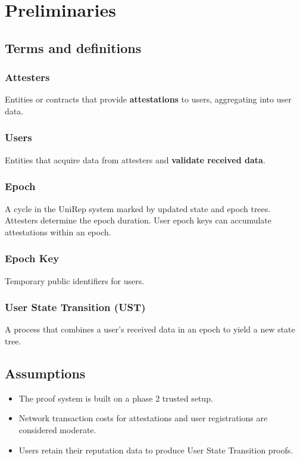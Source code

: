 \documentclass[11pt]{article}
\begin{document}
\section{Preliminaries}
\label{sec:orgfd26e6e}

\subsection{Terms and definitions}
\label{sec:orgf71e98b}

\subsubsection{Attesters}
\label{sec:orge06bb9e}
Entities or contracts that provide \textbf{\textbf{attestations}} to users, aggregating into user data.
\subsubsection{Users}
\label{sec:org4387de1}
Entities that acquire data from attesters and \textbf{\textbf{validate received data}}.
\subsubsection{Epoch}
\label{sec:org88aad3f}
A cycle in the UniRep system marked by updated state and epoch trees. Attesters determine the epoch duration. User epoch keys can accumulate attestations within an epoch.
\subsubsection{Epoch Key}
\label{sec:org7101571}
Temporary public identifiers for users.
\subsubsection{User State Transition (UST)}
\label{sec:org19b9fec}
A process that combines a user's received data in an epoch to yield a new state tree.
\subsection{Assumptions}
\label{sec:orge900b6d}
\begin{itemize}
\item The proof system is built on a phase 2 trusted setup.
\item Network transaction costs for attestations and user registrations are considered moderate.
\item Users retain their reputation data to produce User State Transition proofs.
\end{itemize}
\end{document}
